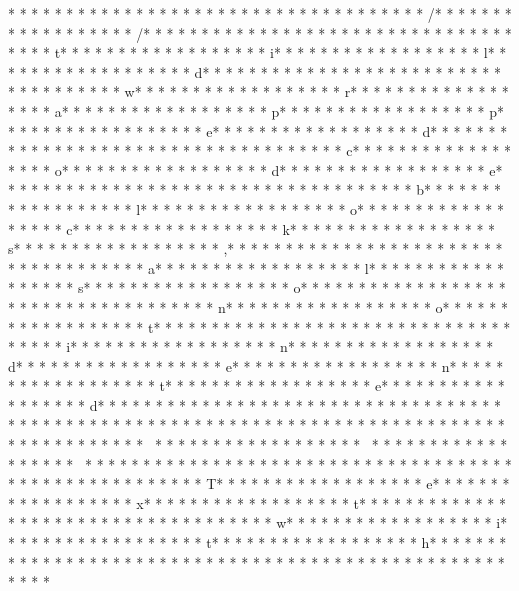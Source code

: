 {* * *  * * *  * * *  *  * * *  *  * * *  * 	* * *  * * *  * * *  *  * * *  *  * * *  * /* * *  * * *  * * *  *  * * *  *  * * *  * /* * *  * * *  * * *  *  * * *  *  * * *  *  * * *  * * *  * * *  *  * * *  *  * * *  * t* * *  * * *  * * *  *  * * *  *  * * *  * i* * *  * * *  * * *  *  * * *  *  * * *  * l* * *  * * *  * * *  *  * * *  *  * * *  * d* * *  * * *  * * *  *  * * *  *  * * *  *  * * *  * * *  * * *  *  * * *  *  * * *  * w* * *  * * *  * * *  *  * * *  *  * * *  * r* * *  * * *  * * *  *  * * *  *  * * *  * a* * *  * * *  * * *  *  * * *  *  * * *  * p* * *  * * *  * * *  *  * * *  *  * * *  * p* * *  * * *  * * *  *  * * *  *  * * *  * e* * *  * * *  * * *  *  * * *  *  * * *  * d* * *  * * *  * * *  *  * * *  *  * * *  *  * * *  * * *  * * *  *  * * *  *  * * *  * c* * *  * * *  * * *  *  * * *  *  * * *  * o* * *  * * *  * * *  *  * * *  *  * * *  * d* * *  * * *  * * *  *  * * *  *  * * *  * e* * *  * * *  * * *  *  * * *  *  * * *  *  * * *  * * *  * * *  *  * * *  *  * * *  * b* * *  * * *  * * *  *  * * *  *  * * *  * l* * *  * * *  * * *  *  * * *  *  * * *  * o* * *  * * *  * * *  *  * * *  *  * * *  * c* * *  * * *  * * *  *  * * *  *  * * *  * k* * *  * * *  * * *  *  * * *  *  * * *  * s* * *  * * *  * * *  *  * * *  *  * * *  * ,* * *  * * *  * * *  *  * * *  *  * * *  *  * * *  * * *  * * *  *  * * *  *  * * *  * a* * *  * * *  * * *  *  * * *  *  * * *  * l* * *  * * *  * * *  *  * * *  *  * * *  * s* * *  * * *  * * *  *  * * *  *  * * *  * o* * *  * * *  * * *  *  * * *  *  * * *  *  * * *  * * *  * * *  *  * * *  *  * * *  * n* * *  * * *  * * *  *  * * *  *  * * *  * o* * *  * * *  * * *  *  * * *  *  * * *  * t* * *  * * *  * * *  *  * * *  *  * * *  *  * * *  * * *  * * *  *  * * *  *  * * *  * i* * *  * * *  * * *  *  * * *  *  * * *  * n* * *  * * *  * * *  *  * * *  *  * * *  * d* * *  * * *  * * *  *  * * *  *  * * *  * e* * *  * * *  * * *  *  * * *  *  * * *  * n* * *  * * *  * * *  *  * * *  *  * * *  * t* * *  * * *  * * *  *  * * *  *  * * *  * e* * *  * * *  * * *  *  * * *  *  * * *  * d* * *  * * *  * * *  *  * * *  *  * * *  * 
* * *  * * *  * * *  *  * * *  *  * * *  * }* * *  * * *  * * *  *  * * *  *  * * *  * 
* * *  * * *  * * *  *  * * *  *  * * *  * 
* * *  * * *  * * *  *  * * *  *  * * *  * ~* * *  * * *  * * *  *  * * *  *  * * *  * ~* * *  * * *  * * *  *  * * *  *  * * *  * ~* * *  * * *  * * *  *  * * *  *  * * *  * 
* * *  * * *  * * *  *  * * *  *  * * *  * 
* * *  * * *  * * *  *  * * *  *  * * *  * T* * *  * * *  * * *  *  * * *  *  * * *  * e* * *  * * *  * * *  *  * * *  *  * * *  * x* * *  * * *  * * *  *  * * *  *  * * *  * t* * *  * * *  * * *  *  * * *  *  * * *  *  * * *  * * *  * * *  *  * * *  *  * * *  * w* * *  * * *  * * *  *  * * *  *  * * *  * i* * *  * * *  * * *  *  * * *  *  * * *  * t* * *  * * *  * * *  *  * * *  *  * * *  * h* * *  * * *  * * *  *  * * *  *  * * *  *  * * *  * * *  * * *  *  * * *  *  * * *  *  * * *  * * *  * * *  *  * * *  *  * * *  * 
